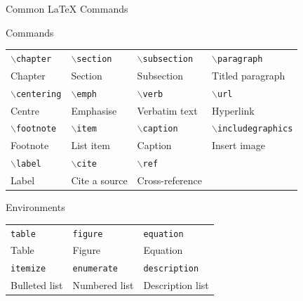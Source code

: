 \documentclass{beamer}
\def\cmd#1{\texttt{\color{ntubrightblue}\footnotesize $\backslash$#1}}
\def\env#1{\texttt{\color{blue}\footnotesize #1}}
\begin{document}
\begin{frame}[fragile]{Common \LaTeX{} Commands}
  \begin{exampleblock}{Commands}
    \centering
    \footnotesize
    \begin{tabular}{llll}
      \cmd{chapter} & \cmd{section} & \cmd{subsection} & \cmd{paragraph} \\
      Chapter & Section & Subsection & Titled paragraph \\\hline
      \cmd{centering} & \cmd{emph} & \cmd{verb} & \cmd{url} \\
      Centre & Emphasise & Verbatim text & Hyperlink \\\hline
      \cmd{footnote} & \cmd{item} & \cmd{caption} & \cmd{includegraphics} \\
      Footnote & List item & Caption & Insert image \\\hline
      \cmd{label} & \cmd{cite} & \cmd{ref} \\
      Label & Cite a source & Cross-reference \\\hline
    \end{tabular}
  \end{exampleblock}

  \begin{exampleblock}{Environments}
    \centering
    \footnotesize
    \begin{tabular}{lll}
      \env{table} & \env{figure} & \env{equation} \\
      Table & Figure & Equation \\\hline
      \env{itemize} & \env{enumerate} & \env{description} \\
      Bulleted list & Numbered list & Description list \\\hline
    \end{tabular}
  \end{exampleblock}
\end{frame}
\end{document}
